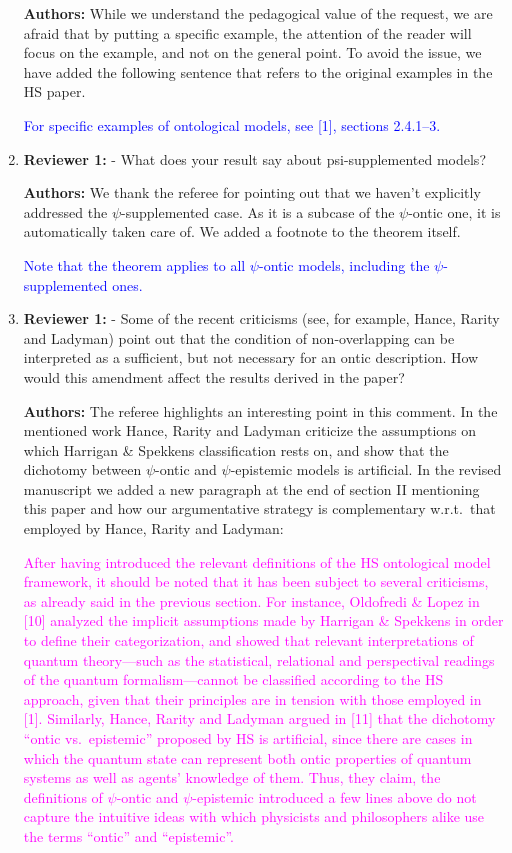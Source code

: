 \documentclass[11pt, executivepaper]{article}
\begin{document}
\begin{enumerate}
\textbf{Authors:} While we understand the pedagogical value of the request, we are afraid that by putting a specific example, the attention of the reader will focus on the example, and not on the general point. To avoid the issue, we have added the following sentence that refers to the original examples in the HS paper.

\textcolor{blue}{ For specific examples of ontological models, see [1], sections 2.4.1--3. }

\item \textbf{Reviewer 1:} - What does your result say about psi-supplemented models?
\vspace{2mm}

\textbf{Authors:} We thank the referee for pointing out that we haven't explicitly addressed the $\psi$-supplemented case. As it is a subcase of the $\psi$-ontic one, it is automatically taken care of. We added a footnote to the theorem itself.

\textcolor{blue}{ Note that the theorem applies to all $\psi$-ontic models, including the $\psi$-supplemented ones.}


\item \textbf{Reviewer 1:} - Some of the recent criticisms (see, for example, Hance, Rarity and Ladyman) point out that the condition of non-overlapping can be interpreted as a sufficient, but not necessary for an ontic description. How would this amendment affect the results derived in the paper?
\vspace{2mm}

\textbf{Authors:} The referee highlights an interesting point in this comment. In the mentioned work Hance, Rarity and Ladyman criticize the assumptions on which Harrigan \& Spekkens classification rests on, and show that the dichotomy between $\psi$-ontic and $\psi$-epistemic models is artificial. In the revised manuscript we added a new paragraph at the end of section II mentioning this paper and how our argumentative strategy is complementary w.r.t.\ that employed by Hance, Rarity and Ladyman:

\textcolor{magenta}{After having introduced the relevant definitions of the HS ontological model framework, it should be noted that it has been subject to several criticisms, as already said in the previous section. For instance, Oldofredi \& Lopez in [10] analyzed the implicit assumptions made by Harrigan \& Spekkens in order to define their categorization, and showed that relevant interpretations of quantum theory---such as the statistical, relational and perspectival readings of the quantum formalism---cannot be classified according to the HS approach, given that their principles are in tension with those employed in [1]. Similarly, Hance, Rarity and Ladyman argued in [11] that the dichotomy ``ontic vs.\ epistemic'' proposed by HS is artificial, since there are cases in which the quantum state can represent both ontic properties of quantum systems as well as agents' knowledge of them. Thus, they claim, the definitions of $\psi$-ontic and $\psi$-epistemic introduced a few lines above do not capture the intuitive ideas with which physicists and philosophers alike use the terms ``ontic'' and ``epistemic''.}


\end{enumerate}
\end{document}

